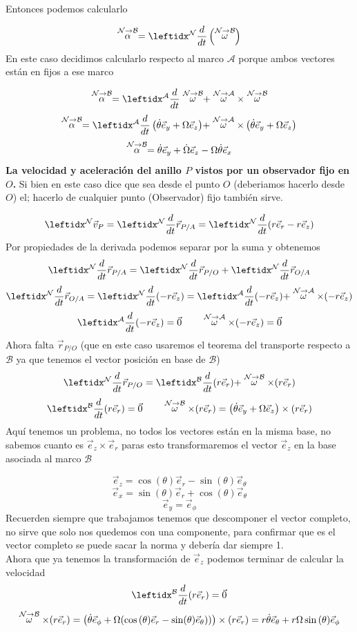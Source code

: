 \begin{tcolorbox}[title=Anillo rotador,breakable]
Entonces podemos calcularlo

$$\accang{N}{B} =\der{}{N}\left(\velang{N}{B}\right)$$
En este caso decidimos calcularlo respecto al marco $\mathcal{A}$ porque ambos vectores están en fijos a ese marco

$$\accang{N}{B}=\transporta{\velang{N}{B}}{N}{A}$$
$$\accang{N}{B}=\transporta{\left(\dot\theta\vec{e}_y+\Omega\vec{e}_z\right)}{N}{A}$$
$$\stackrel{\mathcal{N} \to \mathcal{B}}{\alpha}=\dot\theta\vec{e}_y+\dot\Omega\vec{e}_z-\Omega\dot\theta\vec{e}_x$$
\textbf{La velocidad y aceleración del anillo \( P \) vistos por un observador fijo en \( O \).}
Si bien en este caso dice que sea desde el punto $O$ (deberiamos hacerlo desde $O$) el; hacerlo de cualquier punto (Observador) fijo  también sirve.

$$\marc{\vec{v}_P}{N}=\der{\vec{r}_{P/A}}{N}=\der{(r\vec{e}_r-r\vec{e}_z)}{N}$$
Por propiedades de la derivada podemos separar por la suma y obtenemos
$$\der{\vec{r}_{P/A}}{N}=\der{\vec{r}_{P/O}}{N}+\der{\vec{r}_{O/A}}{N}$$
$$\der{\vec{r}_{O/A}}{N}=\der{(-r\vec{e}_z)}{N}=\transporta{(-r\vec{e}_z)}{N}{A}$$
$$\der{(-r\vec{e}_z)}{A}=\vec{0} \quad\quad \velang{N}{A}\times(-r\vec{e}_z)=\vec{0}$$
Ahora falta $\vec{r}_{P/O}$ (que en este caso usaremos el teorema del transporte respecto a $\mathcal{B}$ ya que tenemos el vector posición en base de $\mathcal{B}$)
$$\der{\vec{r}_{P/O}}{N}=\transporta{(r\vec{e}_r)}{N}{B}$$
$$\der{(r\vec{e}_r)}{B}=\vec{0} \quad\quad \velang{N}{B}\times(r\vec{e}_r)=\left(\dot\theta\vec{e}_y+\Omega\vec{e}_z\right)\times(r\vec{e}_r)$$
Aquí tenemos un problema, no todos los vectores están en la misma base, no sabemos cuanto es $\vec{e}_z\times \vec{e}_r$ paras esto transformaremos el vector $\vec{e}_z$ en la base asociada al marco $\mathcal{B}$

$$\vec{e}_z=\cos{(\theta)}\vec{e}_r-\sin(\theta)\vec{e}_\theta$$
$$\vec{e}_x=\sin{(\theta)}\vec{e}_r+\cos(\theta)\vec{e}_\theta$$
$$\vec{e}_y=\vec{e}_\phi$$
Recuerden siempre que trabajamos tenemos que descomponer el vector completo, no sirve que solo nos quedemos con una componente, para confirmar que es el vector completo se puede sacar la norma y debería dar siempre 1.\\

Ahora que ya tenemos la transformación de $\vec{e}_z$ podemos terminar de calcular la velocidad
$$\der{(r\vec{e}_r)}{B}=\vec{0} $$
$$\stackrel{\mathcal{N} \to \mathcal{B}}{\omega}\times(r\vec{e}_r)=\left(\dot\theta\vec{e}_\phi+\Omega(\cos{(\theta)}\vec{e}_r-\sin(\theta)\vec{e}_\theta))\right)\times(r\vec{e}_r)=r\dot\theta\vec{e}_\theta +r\Omega\sin{(\theta)}\vec{e}_\phi$$


\end{tcolorbox}
